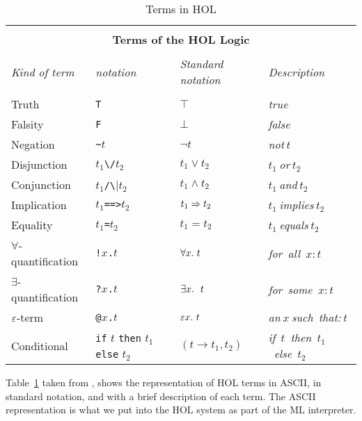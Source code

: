 \begin{center}
  \begin{table}[ht]
    \centering
    \begin{tabular}{|l|l|l|l|} \hline
\multicolumn{4}{|c|}{ } \\
\multicolumn{4}{|c|}{\bf Terms of the HOL Logic} \\
\multicolumn{4}{|c|}{ } \\
{\it Kind of term} & {\it \HOL{} notation} &
{\it Standard notation} &
{\it Description} \\ \hline
 & & & \\
Truth & {\small\verb|T|} & $\top$ & {\it true}\\ \hline
Falsity & {\small\verb|F|} & $\bot$ & {\it false}\\ \hline
Negation & {\small\verb|~|}$t$ & $\neg t$ & {\it not}$\ t$\\ \hline
Disjunction & $t_1${\small\verb|\/|}$t_2$ & $t_1\vee t_2$ &
$t_1\ ${\it or}$\ t_2$ \\ \hline
Conjunction & $t_1${\small\verb|/\|}$t_2$ & $t_1\wedge t_2$ &
$t_1\ ${\it and}$\ t_2$ \\ \hline
Implication & $t_1${\small\verb|==>|}$t_2$ & $t_1\Rightarrow t_2$ &
$t_1\ ${\it implies}$\ t_2$ \\ \hline
Equality & $t_1${\small\verb|=|}$t_2$ & $t_1 = t_2$ &
$t_1\ ${\it equals}$\ t_2$ \\ \hline
$\forall$-quantification & {\small\verb|!|}$x${\small\verb|.|}$t$ &
$\forall x.\ t$ & {\it for\ all\ }$x: t$ \\ \hline
$\exists$-quantification & {\small\verb|?|}$x${\small\verb|.|}$t$ &
$\equant{x}\ t$ & {\it for\ some\ }$x: t$ \\ \hline
$\varepsilon$-term & {\small\verb|@|}$x${\small\verb|.|}$t$ &
$\varepsilon x.\ t$ & {\it an}$\ x\ ${\it such\ that:}$\ t$ \\ \hline
Conditional & {\small\verb|if|} $t$ {\small\verb|then|} $t_1$
              {\small\verb|else|} $t_2$ &
$(t\rightarrow t_1, t_2)$ & {\it if\ }$t${\it \ then\ }$t_1${\it\ else\ }$t_2$
 \\ \hline
\end{tabular}

\caption{Terms in HOL}
\label{tab:logic-table}
\end{table}
\end{center}

Table~\ref{tab:logic-table} taken from \cite{HOLTutorial}, shows the
representation of HOL terms in ASCII, in standard notation, and with a
brief description of each term. The ASCII representation is what we
put into the HOL system as part of the ML interpreter.

